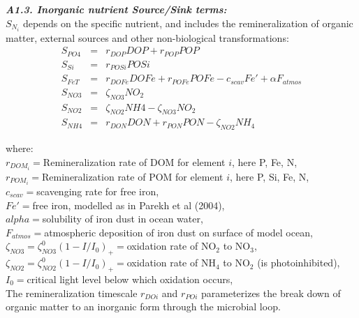 \documentclass[11pt,letterpaper,english]{article}
\begin{document}
{\it {\bf A1.3. Inorganic nutrient Source/Sink terms:}}\\
$S_{N_i}$ depends on the specific nutrient, and includes the remineralization
of organic matter, external sources and other non-biological transformations:
\begin{eqnarray}
S_{PO4} & = & r_{DOP} DOP + r_{POP} POP \nonumber \\
S_{Si}  & = & r_{POSi} POSi \nonumber \\
S_{FeT} & = &  r_{DOFe} DOFe + r_{POFe} POFe -c_{scav} Fe' + \alpha F_{atmos} \nonumber \\
S_{NO3} & = &  \zeta_{NO3} NO_2 \nonumber \\
S_{NO2} & = &  \zeta_{NO2} NH4 - \zeta_{NO3} NO_2 \nonumber \\
S_{NH4} & = &  r_{DON} DON + r_{PON} PON - \zeta_{NO2} NH_4 \nonumber
\end{eqnarray}

where:\\
\mbox{} \hspace{.5cm} $r_{DOM_i}=$Remineralization rate of DOM for element
$i$, here P, Fe, N,\\
\mbox{} \hspace{.5cm} $r_{POM_i}=$Remineralization rate of POM for element
$i$, here P, Si, Fe, N,\\
\mbox{} \hspace{.5cm} $c_{scav}=$scavenging rate for free iron,\\
\mbox{} \hspace{.5cm} $Fe'=$free iron, modelled as in Parekh et al (2004), \\
\mbox{} \hspace{.5cm} $alpha=$solubility of iron dust in ocean water, \\
\mbox{} \hspace{.5cm} $F_{atmos}=$atmospheric deposition of iron dust on surface of model ocean,\\
\mbox{} \hspace{.5cm} $\zeta_{NO3}=\zeta_{NO3}^0(1-I/I_0)_+=$oxidation rate of NO$_2$ to NO$_3$,\\
\mbox{} \hspace{.5cm} $\zeta_{NO2}=\zeta_{NO2}^0(1-I/I_0)_+=$oxidation rate of NH$_4$ to NO$_2$ (is photoinhibited),\\
\mbox{} \hspace{.5cm} $I_0=$critical light level below which oxidation occurs,\\

The remineralization timescale $r_{DOi}$ and $r_{POi}$ parameterizes the break
down of organic matter to an inorganic form through the microbial loop.
\end{document}

